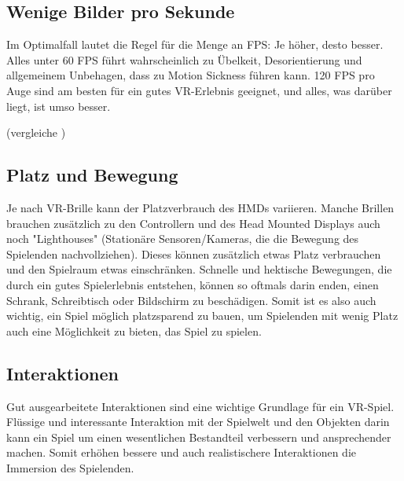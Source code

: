 \subsection{Wenige Bilder pro Sekunde}
Im Optimalfall lautet die Regel für die Menge an FPS: Je höher, desto besser. Alles unter 60 FPS führt wahrscheinlich zu Übelkeit, Desorientierung und allgemeinem Unbehagen, dass zu Motion Sickness führen kann. 120 FPS pro Auge sind am besten für ein gutes VR-Erlebnis geeignet, und alles, was darüber liegt, ist umso besser.

(vergleiche \cite{_vr_linde})

\subsection{Platz und Bewegung}
Je nach VR-Brille kann der Platzverbrauch des HMDs variieren. Manche Brillen brauchen zusätzlich zu den Controllern und des Head Mounted Displays auch noch "Lighthouses" (Stationäre Sensoren/Kameras, die die Bewegung des Spielenden nachvollziehen). Dieses können zusätzlich etwas Platz verbrauchen und den Spielraum etwas einschränken. Schnelle und hektische Bewegungen, die durch ein gutes Spielerlebnis entstehen, können so oftmals darin enden, einen Schrank, Schreibtisch oder Bildschirm zu beschädigen. Somit ist es also auch wichtig, ein Spiel möglich platzsparend zu bauen, um Spielenden mit wenig Platz auch eine Möglichkeit zu bieten, das Spiel zu spielen.

\subsection{Interaktionen}
Gut ausgearbeitete Interaktionen sind eine wichtige Grundlage für ein VR-Spiel. Flüssige und interessante Interaktion mit der Spielwelt und den Objekten darin kann ein Spiel um einen wesentlichen Bestandteil verbessern und ansprechender machen. Somit erhöhen bessere und auch realistischere Interaktionen die Immersion des Spielenden.